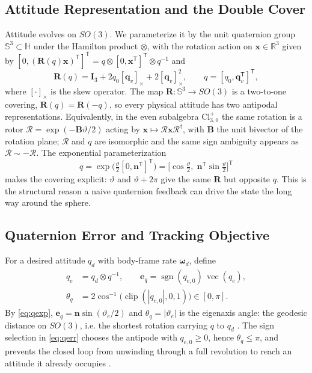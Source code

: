 \documentclass[letterpaper,10pt,conference]{IEEEtran}
\newcommand{\R}{\mathbb{R}}
\newcommand{\T}{^{\mathsf T}}
\newcommand{\clip}{\operatorname{clip}}
\newcommand{\sgn}{\operatorname{sgn}}
\newcommand{\vecpart}{\operatorname{vec}}
\begin{document}
\subsection{Attitude Representation and the Double Cover}
\label{sec:doublecover}

Attitude evolves on $SO(3)$. We parameterize it by the unit quaternion
group $\mathbb{S}^3\subset\mathbb{H}$ under the Hamilton product
$\otimes$, with the rotation action on $\bm x\in\R^3$ given by
$[0,(\bm R(q)\bm x)\T]\T=q\otimes[0,\bm x\T]\T\otimes q^{-1}$ and
\begin{equation}
    \bm R(q)=\bm I_3+2q_0[\bm q_v]_\times+2[\bm q_v]_\times^2,
    \qquad q=[q_0,\bm q_v\T]\T,
    \label{eq:Rq}
\end{equation}
where $[\cdot]_\times$ is the skew operator. The map
$\bm R:\mathbb{S}^3\to SO(3)$ is a two-to-one covering,
$\bm R(q)=\bm R(-q)$, so every physical attitude has two antipodal
representations. Equivalently, in the even subalgebra
$\mathrm{Cl}^{+}_{3,0}$ the same rotation is a rotor
$\mathcal R=\exp(-\bm B\vartheta/2)$ acting by $\bm x\mapsto
\mathcal R\bm x\mathcal R^{\dagger}$, with $\bm B$ the unit bivector of the
rotation plane; $\mathcal R$ and $q$ are isomorphic and the same
sign ambiguity appears as $\mathcal R\sim-\mathcal R$. The exponential
parameterization
\begin{equation}
    q=\exp\!\Big(\tfrac{\vartheta}{2}[0,\bm n\T]\T\Big)
     =\Big[\cos\tfrac{\vartheta}{2},\;\bm n\T\sin\tfrac{\vartheta}{2}\Big]\T
    \label{eq:qexp}
\end{equation}
makes the covering explicit: $\vartheta$ and $\vartheta+2\pi$ give the same
$\bm R$ but opposite $q$. This is the structural reason a naive quaternion
feedback can drive the state the long way around the sphere.

\subsection{Quaternion Error and Tracking Objective}

For a desired attitude $q_d$ with body-frame rate $\bm\omega_d$, define
\begin{align}
    q_e &= q_d\otimes q^{-1},\qquad
    \bm e_q = \sgn(q_{e,0})\,\vecpart(q_e),
    \label{eq:qerr}\\
    \theta_q &= 2\cos^{-1}\!\big(\clip(|q_{e,0}|,0,1)\big)\in[0,\pi].
    \label{eq:theta}
\end{align}
By \eqref{eq:qexp}, $\bm e_q=\bm n\sin(\vartheta_e/2)$ and
$\theta_q=|\vartheta_e|$ is the eigenaxis angle: the geodesic distance on
$SO(3)$, i.e. the shortest rotation carrying $q$ to $q_d$
\cite{wie1985quaternion,wie1989eigenaxis}. The sign selection in
\eqref{eq:qerr} chooses the antipode with $q_{e,0}\ge0$, hence
$\theta_q\le\pi$, and prevents the closed loop from unwinding through a
full revolution to reach an attitude it already occupies
\cite{mayhew2013unwinding,mayhew2011acc}.
\end{document}
